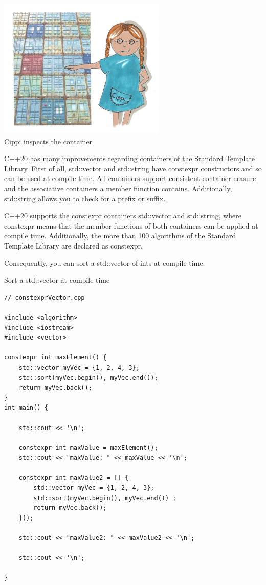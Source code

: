 \begin{center}
\includegraphics[width=0.6\textwidth]{content/3/chapter5/images/10.png}\\
Cippi inspects the container
\end{center}

C++20 has many improvements regarding containers of the Standard Template Library. First of all, std::vector and std::string have constexpr constructors and so can be used at compile time. All containers support consistent container erasure and the associative containers a member function contains. Additionally, std::string allows you to check for a prefix or suffix.


C++20 supports the constexpr containers std::vector and std::string, where constexpr means that the member functions of both containers can be applied at compile time. Additionally, the more than 100 \href{https://en.cppreference.com/w/cpp/algorithm}{algorithms} of the Standard Template Library are declared as constexpr.

Consequently, you can sort a std::vector of ints at compile time.

\noindent
Sort a std::vector at compile time
\begin{lstlisting}[style=styleCXX]
// constexprVector.cpp

#include <algorithm>
#include <iostream>
#include <vector>

constexpr int maxElement() {
	std::vector myVec = {1, 2, 4, 3};
	std::sort(myVec.begin(), myVec.end());
	return myVec.back();
}
int main() {

	std::cout << '\n';
	
	constexpr int maxValue = maxElement();
	std::cout << "maxValue: " << maxValue << '\n';
	
	constexpr int maxValue2 = [] {
		std::vector myVec = {1, 2, 4, 3};
		std::sort(myVec.begin(), myVec.end()) ;
		return myVec.back();
	}();
	
	std::cout << "maxValue2: " << maxValue2 << '\n';
	
	std::cout << '\n';

}
\end{lstlisting}

